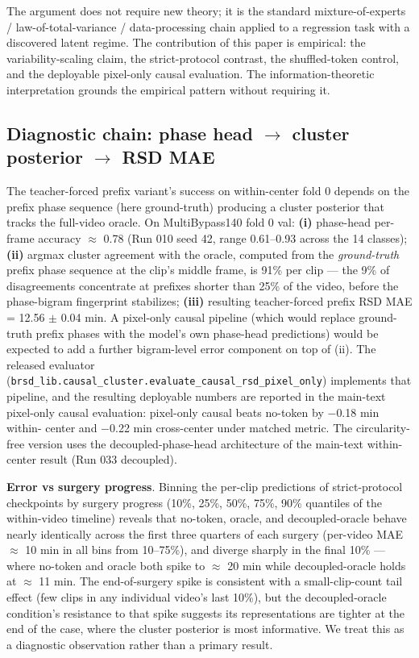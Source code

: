The argument does not require new theory; it is the standard
mixture-of-experts / law-of-total-variance / data-processing chain
applied to a regression task with a discovered latent regime. The
contribution of this paper is empirical: the variability-scaling claim,
the strict-protocol contrast, the shuffled-token control, and the
deployable pixel-only causal evaluation. The
information-theoretic interpretation grounds the empirical pattern
without requiring it.

\subsection{Diagnostic chain: phase head $\rightarrow$ cluster posterior $\rightarrow$ RSD MAE}\label{diagnostic-chain-phase-head-cluster-posterior-rsd-mae}

The teacher-forced prefix variant's success on within-center fold 0
depends on the prefix phase sequence (here ground-truth) producing a
cluster posterior that tracks the full-video oracle. On MultiBypass140
fold 0 val: \textbf{(i)} phase-head per-frame accuracy $\approx$ 0.78 (Run 010
seed 42, range 0.61--0.93 across the 14 classes); \textbf{(ii)} argmax
cluster agreement with the oracle, computed from the \emph{ground-truth}
prefix phase sequence at the clip's middle frame, is 91\% per clip ---
the 9\% of disagreements concentrate at prefixes shorter than 25\% of
the video, before the phase-bigram fingerprint stabilizes;
\textbf{(iii)} resulting teacher-forced prefix RSD MAE = 12.56 $\pm$ 0.04
min. A pixel-only causal pipeline (which would replace ground-truth
prefix phases with the model's own phase-head predictions) would be
expected to add a further bigram-level error component on top of (ii).
The released evaluator
(\texttt{brsd\_lib.causal\_cluster.evaluate\_causal\_rsd\_pixel\_only})
implements that pipeline, and the resulting deployable numbers are
reported in the main-text pixel-only causal evaluation: pixel-only causal beats no-token by $-$0.18 min within-
center and $-$0.22 min cross-center under matched metric. The
circularity-free version uses the decoupled-phase-head architecture of
the main-text within-center result (Run 033 decoupled).

\textbf{Error vs surgery progress}. Binning the per-clip
predictions of strict-protocol checkpoints by surgery progress (10\%,
25\%, 50\%, 75\%, 90\% quantiles of the within-video timeline) reveals
that no-token, oracle, and decoupled-oracle behave nearly identically
across the first three quarters of each surgery (per-video MAE $\approx$ 10 min
in all bins from 10--75\%), and diverge sharply in the final 10\% ---
where no-token and oracle both spike to $\approx$ 20 min while decoupled-oracle
holds at $\approx$ 11 min. The end-of-surgery spike is consistent with a
small-clip-count tail effect (few clips in any individual video's last
10\%), but the decoupled-oracle condition's resistance to that spike
suggests its representations are tighter at the end of the case, where
the cluster posterior is most informative. We treat this as a diagnostic
observation rather than a primary result.

